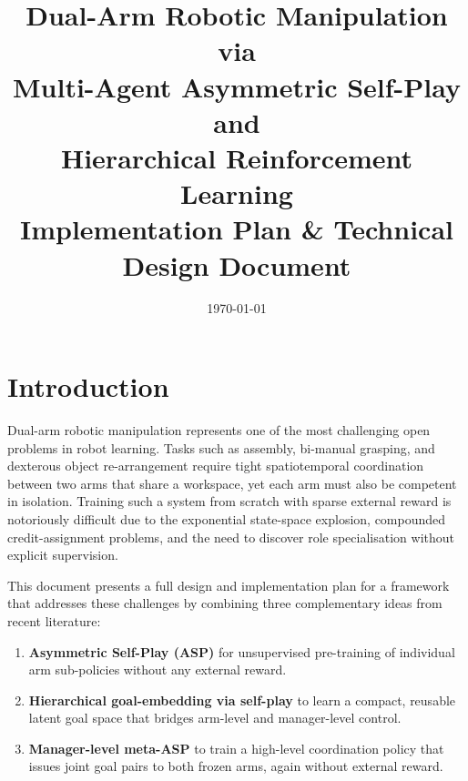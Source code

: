 \documentclass[12pt, a4paper]{article}
\begin{document}
\title{%
  \textbf{Dual-Arm Robotic Manipulation via\\
  Multi-Agent Asymmetric Self-Play and\\
  Hierarchical Reinforcement Learning}\\[0.5em]
  \large Implementation Plan \& Technical Design Document
}
\author{}
\date{\today}
\maketitle
\tableofcontents
\newpage

\section{Introduction}
\label{sec:intro}

Dual-arm robotic manipulation represents one of the most challenging open problems in robot
learning. Tasks such as assembly, bi-manual grasping, and dexterous object re-arrangement
require tight spatiotemporal coordination between two arms that share a workspace, yet each
arm must also be competent in isolation. Training such a system from scratch with sparse
external reward is notoriously difficult due to the exponential state-space explosion,
compounded credit-assignment problems, and the need to discover role specialisation without
explicit supervision.

This document presents a full design and implementation plan for a framework that addresses
these challenges by combining three complementary ideas from recent literature:

\begin{enumerate}[label=(\roman*)]
    \item \textbf{Asymmetric Self-Play (ASP)} \cite{sukhbaatar2018intrinsic,plappert2021asymmetric}
          for unsupervised pre-training of individual arm sub-policies without any external reward.
    \item \textbf{Hierarchical goal-embedding via self-play} \cite{sukhbaatar2018learning} to learn
          a compact, reusable latent goal space that bridges arm-level and manager-level control.
    \item \textbf{Manager-level meta-ASP} to train a high-level coordination policy that issues
          joint goal pairs to both frozen arms, again without external reward.
\end{enumerate}
\end{document}
